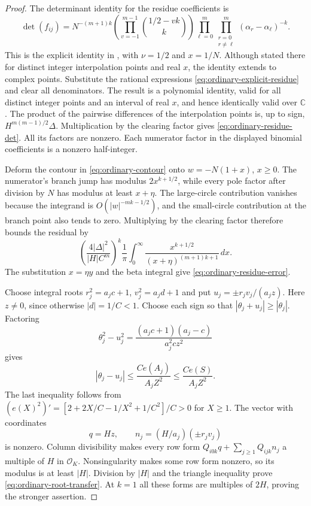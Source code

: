 \documentclass[12pt]{article}
\numberwithin{equation}{section}
\begin{document}
\begin{proof}
The determinant identity for the residue coefficients is
\[
 \det(f_{ij})=
 N^{-(m+1)k}
 \left(\prod_{v=-1}^{m-1}\binom{1/2-vk}{k}\right)
 \prod_{\ell=0}^m\prod_{\substack{r=0\\r\ne\ell}}^m
             (\alpha_r-\alpha_\ell)^{-k}.
\]
This is the explicit identity in \cite[p.~1721]{Bennett96}, with
$\nu=1/2$ and $x=1/N$.  Although stated there for distinct integer interpolation points and real $x$, the identity extends to complex points. Substitute the rational expressions
\eqref{eq:ordinary-explicit-residue} and clear all denominators.  The
result is a polynomial identity, valid for all distinct integer points
and an interval of real $x$, and hence identically valid over
$\mathbb C$.  The product of the pairwise differences of the interpolation points is, up to sign, $H^{m(m-1)/2}\Delta$.  Multiplication by the clearing factor gives
\eqref{eq:ordinary-residue-det}.  All its factors are nonzero. Each
numerator factor in the displayed binomial coefficients is a nonzero
half-integer.

Deform the contour in \eqref{eq:ordinary-contour} onto
$w=-N(1+x)$, $x\ge0$.  The numerator's branch jump has modulus
$2x^{k+1/2}$, while every pole factor after division by $N$ has modulus at least
$x+\eta$.  The large-circle contribution vanishes because the
integrand is $O(|w|^{-mk-1/2})$, and the small-circle contribution at
the branch point also tends to zero.  Multiplying by the clearing
factor therefore bounds the residual by
\[
 \left(\frac{4|\Delta|^2}{|H|C^m}\right)^k\frac1\pi
 \int_0^\infty\frac{x^{k+1/2}}{(x+\eta)^{(m+1)k+1}}\,dx.
\]
The substitution $x=\eta y$ and the beta integral give
\eqref{eq:ordinary-residue-error}.

Choose integral roots $r_j^2=a_jc+1$, $v_j^2=a_jd+1$ and put
$u_j=\pm r_jv_j/(a_jz)$.  Here $z\ne0$, since otherwise
$|d|=1/C<1$.  Choose each sign so that
$|\theta_j+u_j|\ge|\theta_j|$.  Factoring
\[
 \theta_j^2-u_j^2
 =\frac{(a_jc+1)(a_j-c)}{a_j^2cz^2}
\]
gives
\[
 |\theta_j-u_j|\le\frac{Ce(A_j)}{A_jZ^2}
                 \le\frac{Ce(S)}{A_jZ^2}.
\]
The last inequality follows from
$(e(X)^2)'=[2+2X/C-1/X^2+1/C^2]/C>0$ for $X\ge1$.
The vector with coordinates
\[
 q=Hz,\qquad n_j=(H/a_j)(\pm r_jv_j)
\]
is nonzero.  Column divisibility makes every row form
$Q_{i0k}q+\sum_{j\ge1}Q_{ijk}n_j$ a multiple of $H$ in
$\mathcal O_K$.  Nonsingularity makes some row form nonzero, so its
modulus is at least $|H|$.  Division by $|H|$ and the triangle
inequality prove \eqref{eq:ordinary-root-transfer}.  At $k=1$ all
these forms are multiples of $2H$, proving the stronger assertion.
\end{proof}
\end{document}
